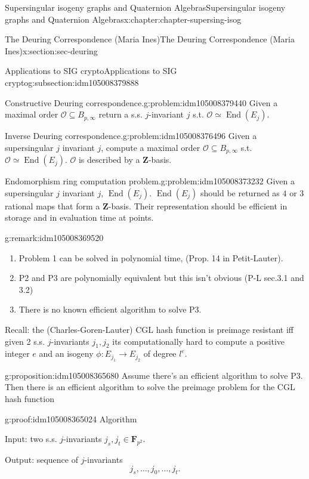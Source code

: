 \documentclass[oneside,10pt,]{book}
\numberwithin{equation}{section}
\newcommand{\ZZ}{\mathbf{Z}}
\newcommand{\FF}{\mathbf{F}}
\newcommand{\ints}{\mathcal{O}}
\DeclareMathOperator{\End}{End}
\begin{document}
\begin{chapterptx}{Supersingular isogeny graphs and Quaternion Algebras}{}{Supersingular isogeny graphs and Quaternion Algebras}{}{}{x:chapter:chapter-supersing-isog}
\begin{sectionptx}{The Deuring Correspondence (Maria Ines)}{}{The Deuring Correspondence (Maria Ines)}{}{}{x:section:sec-deuring}
\begin{subsectionptx}{Applications to SIG crypto}{}{Applications to SIG crypto}{}{}{g:subsection:idm105008379888}
\begin{problem}{Constructive Deuring correspondence.}{g:problem:idm105008379440}
Given a maximal order \(\ints \subseteq B_{p,\infty}\) return a s.s. \(j\)-invariant \(j\) s.t. \(\ints \simeq \End(E_j)\).%
\end{problem}
\begin{problem}{Inverse Deuring correspondence.}{g:problem:idm105008376496}%
Given a supersingular \(j\) invariant \(j\), compute a maximal order \(\ints \subseteq B_{p,\infty}\)  s.t. \(\ints \simeq \End(E_j)\). \(\ints\) is described by a \(\ZZ\)-basis.%
\end{problem}
\begin{problem}{Endomorphism ring computation problem.}{g:problem:idm105008373232}%
Given a supersingular \(j\) invariant \(j\), \(\End(E_j)\). \(\End(E_j)\) should be returned as \(4\) or \(3\) rational maps that form a \(\ZZ\)-basis. Their representation should be efficient in storage and in evaluation time at points.%
\end{problem}
\begin{remark}{}{g:remark:idm105008369520}%
%
\begin{enumerate}
\item{}Problem 1 can be solved in polynomial time, (Prop. 14 in Petit-Lauter).%
\item{}P2 and P3 are polynomially equivalent but this isn't obvious (P-L sec.3.1 and 3.2)%
\item{}There is no known efficient algorithm to solve P3.%
\end{enumerate}
%
\end{remark}
Recall: the (Charles-Goren-Lauter) CGL hash function is preimage resistant iff given 2 s.s. \(j\)-invariants \(j_1,j_2\) its computationally hard to compute a  positive integer \(e\) and an isogeny \(\phi \colon E_{j_1} \to E_{j_2}\) of degree \(l^e\).%
\begin{proposition}{}{}{g:proposition:idm105008365680}%
Assume there's an efficient algorithm to solve P3. Then there is an efficient algorithm to solve the preimage problem for the CGL hash function%
\end{proposition}
\begin{proofptx}{}{g:proof:idm105008365024}
Algorithm%
\par
Input: two s.s. \(j\)-invariants \(j_s,j_t \in \FF_{p^2}\).%
\par
Output: sequence of \(j\)-invariants%
\begin{equation*}
j_s,\ldots,j_0,\ldots, j_t\text{.}
\end{equation*}
%
\par
%
\begin{enumerate}

\end{enumerate}
\end{proofptx}
\end{subsectionptx}
\end{sectionptx}
\end{chapterptx}
\end{document}
